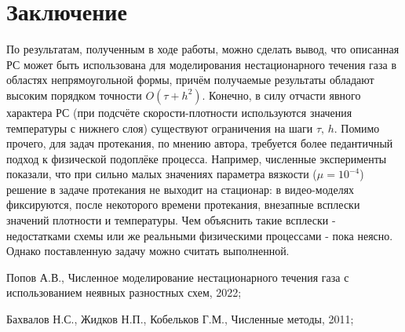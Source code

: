 \documentclass[a4paper]{article}
\theoremstyle{definition}
\numberwithin{equation}{section}
\begin{document}
\newpage
\section{Заключение}
По результатам, полученным в ходе работы, можно сделать вывод, что описанная РС может быть использована для моделирования нестационарного течения газа в областях непрямоугольной формы, причём получаемые результаты обладают высоким порядком точности $O(\tau + h^2)$. Конечно, в силу отчасти явного характера РС (при подсчёте скорости-плотности используются значения температуры с нижнего слоя) существуют ограничения на шаги $\tau, \, h$. Помимо прочего, для задач протекания, по мнению автора, требуется более педантичный подход к физической подоплёке процесса. Например, численные эксперименты показали, что при сильно малых значениях параметра вязкости ($\mu=10^{-4}$) решение в задаче протекания не выходит на стационар: в видео-моделях фиксируются, после некоторого времени протекания, внезапные всплески значений плотности и температуры. Чем объяснить такие всплески - недостатками схемы или же реальными физическими процессами - пока неясно. Однако поставленную задачу можно считать выполненной. 
\newpage
{}%
\begin{thebibliography}{2}

 Попов А.В., Численное моделирование нестационарного течения газа с использованием неявных разностных схем, 2022;

 Бахвалов Н.С., Жидков Н.П., Кобельков Г.М., Численные методы, 2011; 
\end{thebibliography}
\end{document}
